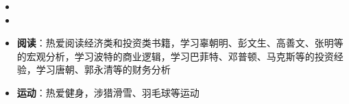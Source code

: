   \begin{itemize}[leftmargin=*]
    \item
    \item
  \end{itemize}


\begin{itemize}[leftmargin=*]
  \item \textbf{阅读}：热爱阅读经济类和投资类书籍，学习辜朝明、彭文生、高善文、张明等的宏观分析，学习波特的商业逻辑，学习巴菲特、邓普顿、马克斯等的投资经验，学习唐朝、郭永清等的财务分析
  \item \textbf{运动}：热爱健身，涉猎滑雪、羽毛球等运动
\end{itemize}